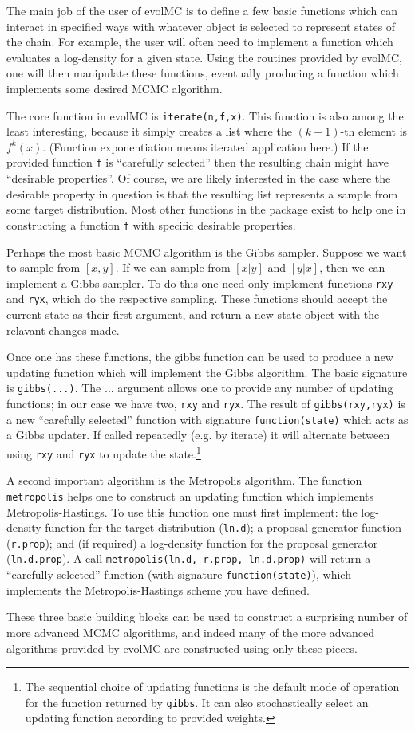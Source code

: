 \documentclass[12pt]{article}\usepackage[]{graphicx}\usepackage[]{color}
\begin{document}
The main job of the user of evolMC is to define a few basic functions which can interact in specified ways with whatever object is selected to represent states of the chain. For example, the user will often need to implement a function which evaluates a log-density for a given state. Using the routines provided by evolMC, one will then manipulate these functions, eventually producing a function which implements some desired MCMC algorithm.

The core function in evolMC is \texttt{iterate(n,f,x)}. This function is also among the least interesting, because it simply creates a list where the $(k+1)$-th element is $f^{k}(x)$. (Function exponentiation means iterated application here.) If the provided function {\tt f} is ``carefully selected'' then the resulting chain might have ``desirable properties''. Of course, we are likely interested in the case where the desirable property in question is that the resulting list represents a sample from some target distribution. Most other functions in the package exist to help one in constructing a function {\tt f} with specific desirable properties.

Perhaps the most basic MCMC algorithm is the Gibbs sampler. Suppose we want to sample from $[x,y]$. If we can sample from $[x|y]$ and $[y|x]$, then we can implement a Gibbs sampler. To do this one need only implement functions {\tt rxy} and {\tt ryx}, which do the respective sampling. These functions should accept the current state as their first argument, and return a new state object with the relavant changes made.

Once one has these functions, the gibbs function can be used to produce a new updating function which will implement the Gibbs algorithm. The basic signature is {\tt gibbs(...)}. The ...  argument allows one to provide any number of updating functions; in our case we have two, {\tt rxy} and {\tt ryx}. The result of {\tt gibbs(rxy,ryx)} is a new ``carefully selected'' function with signature \texttt{function(state)} which acts as a Gibbs updater. If called repeatedly (e.g. by iterate) it will alternate between using {\tt rxy} and {\tt ryx} to update the state.\footnote{The sequential choice of updating functions is the default mode of operation for the function returned by {\tt gibbs}. It can also stochastically select an updating function according to provided weights.}

A second important algorithm is the Metropolis algorithm. The function {\tt metropolis} helps one to construct an updating function which implements Metropolis-Hastings. To use this function one must first implement: the log-density function for the target distribution ({\tt ln.d}); a proposal generator function ({\tt r.prop}); and (if required) a log-density function for the proposal generator ({\tt ln.d.prop}). A call {\tt metropolis(ln.d, r.prop, ln.d.prop)} will return a ``carefully selected'' function (with signature {\tt function(state)}), which implements the Metropolis-Hastings scheme you have defined.

These three basic building blocks can be used to construct a surprising number of more advanced MCMC algorithms, and indeed many of the more advanced algorithms provided by evolMC are constructed using only these pieces.
\end{document}

